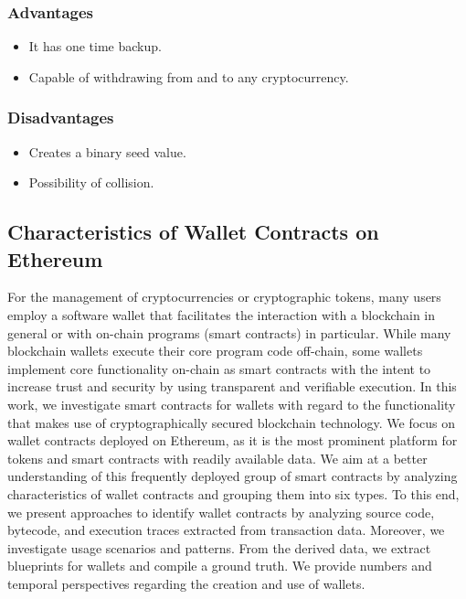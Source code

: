 \documentclass[12pt]{article}
\begin{document}
\newpage

\subsubsection{Advantages}
\begin{itemize}
\item It has one time backup.
\item Capable of withdrawing from and to any cryptocurrency.

\end{itemize}
\vspace{10px}
\subsubsection{Disadvantages}
\begin{itemize}
\item Creates a binary seed value.
\item Possibility of collision.


\end{itemize}
\vspace{10px}

\newpage
\subsection{Characteristics of Wallet Contracts on Ethereum
}

For the management of cryptocurrencies or cryptographic tokens, many users employ a software wallet that
facilitates the interaction with a blockchain in general or with
on-chain programs (smart contracts) in particular. While many
blockchain wallets execute their core program code off-chain,
some wallets implement core functionality on-chain as smart
contracts with the intent to increase trust and security by using
transparent and verifiable execution.
In this work, we investigate smart contracts for wallets with
regard to the functionality that makes use of cryptographically
secured blockchain technology. We focus on wallet contracts
deployed on Ethereum, as it is the most prominent platform for
tokens and smart contracts with readily available data. We aim at
a better understanding of this frequently deployed group of smart
contracts by analyzing characteristics of wallet contracts and
grouping them into six types. To this end, we present approaches
to identify wallet contracts by analyzing source code, bytecode,
and execution traces extracted from transaction data. Moreover,
we investigate usage scenarios and patterns. From the derived
data, we extract blueprints for wallets and compile a ground
truth. We provide numbers and temporal perspectives regarding
the creation and use of wallets.
\end{document}
